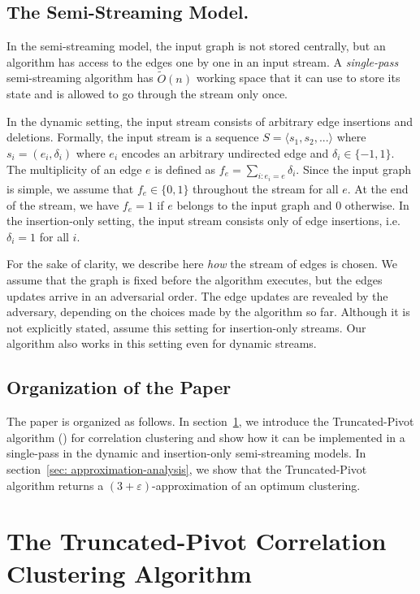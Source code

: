 \documentclass{theoretics}
\newcommand{\truncatedpivot}{\textrm{Truncated-Pivot}\xspace}
\newcommand{\eps}{\ensuremath{\varepsilon}}
\begin{document}
\subsection{The Semi-Streaming Model.}\label{sec: model}
In the semi-streaming model, the input graph is not stored centrally, but an algorithm has access to the edges one by one in an input stream. A \emph{single-pass} semi-streaming algorithm has $\widetilde{O}(n)$ working space that it can use to store its state and is allowed to go through the stream only once. 

In the dynamic setting, the input stream consists of arbitrary edge insertions and deletions. Formally, the input
stream is a sequence $S = \langle s_1, s_2, . . .\rangle$ where $s_i = (e_i, \delta_i)$
where $e_i$ encodes an arbitrary undirected edge and $\delta_i \in \{-1, 1\}$. The multiplicity of an edge $e$ is defined as $f_e = \sum_{i:e_i=e} \delta_i$. Since the input graph is simple, we assume that $f_e \in \{0, 1\}$ throughout the stream for all $e$. 
At the end of the stream, we have $f_e = 1$ if $e$ belongs to the input graph and $0$ otherwise. 
In the insertion-only setting, the input stream consists only of edge insertions, i.e. $\delta_i = 1$ for all $i$. 

For the sake of clarity, we describe here \emph{how} the stream of edges is chosen. We assume that the graph is fixed before the algorithm executes, but the edges updates arrive in an adversarial order. The edge updates are revealed by the adversary, depending on the choices made by the algorithm so far. Although it is not explicitly stated, \cite{behnezhad2023single,chakrabarty2023singlepass} assume this setting for insertion-only streams. Our algorithm also works in this setting even for dynamic streams.


\subsection*{Organization of the Paper}
 The paper is organized as follows.
In section~\ref{sec: truncated-pivot}, we introduce the \truncatedpivot algorithm () for correlation clustering and show how it can be implemented in a single-pass in the dynamic and insertion-only semi-streaming models.
In section~\ref{sec: approximation-analysis}, we show that the \truncatedpivot algorithm returns a $(3+\eps)$-approximation of an optimum clustering. 



\section{The \truncatedpivot Correlation Clustering Algorithm}\label{sec: truncated-pivot}
\end{document}
